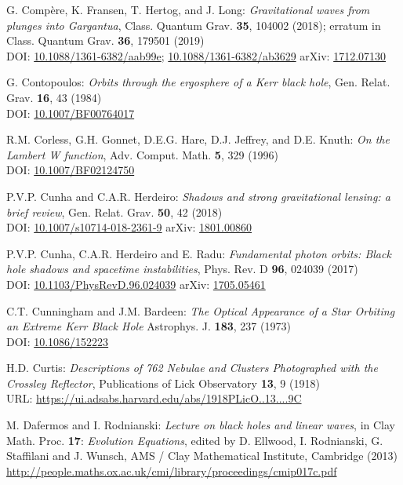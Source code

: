 \begin{thebibliography}{123}
G. Compère, K. Fransen, T. Hertog, and J. Long:
{\em Gravitational waves from plunges into Gargantua},
Class. Quantum Grav. {\bf 35}, 104002 (2018);
erratum in Class. Quantum Grav. {\bf 36}, 179501 (2019) \\
DOI: \href{https://doi.org/10.1088/1361-6382/aab99e}{10.1088/1361-6382/aab99e};
\href{https://doi.org/10.1088/1361-6382/ab3629}{10.1088/1361-6382/ab3629}
\hfill
arXiv: \href{https://arxiv.org/abs/1712.07130}{1712.07130}

G. Contopoulos:
{\em Orbits through the ergosphere of a Kerr black hole},
Gen. Relat. Grav. {\bf 16}, 43 (1984)\\
DOI: \href{https://doi.org/10.1007/BF00764017}{10.1007/BF00764017}

R.M. Corless, G.H. Gonnet, D.E.G. Hare, D.J. Jeffrey, and D.E. Knuth:
{\em On the Lambert W function},
Adv. Comput. Math. {\bf 5}, 329 (1996)\\
DOI: \href{https://doi.org/10.1007/BF02124750}{10.1007/BF02124750}

P.V.P. Cunha and C.A.R. Herdeiro:
{\em Shadows and strong gravitational lensing: a brief review},
Gen. Relat. Grav. {\bf 50}, 42 (2018)\\
DOI: \href{https://doi.org/10.1007/s10714-018-2361-9}{10.1007/s10714-018-2361-9}\hfill
arXiv: \href{https://arxiv.org/abs/1801.00860}{1801.00860}

P.V.P. Cunha, C.A.R. Herdeiro and E. Radu:
{\em Fundamental photon orbits: Black hole shadows and spacetime instabilities},
Phys. Rev. D {\bf 96}, 024039 (2017)\\
DOI: \href{https://doi.org/10.1103/PhysRevD.96.024039}{10.1103/PhysRevD.96.024039}\hfill
arXiv: \href{https://arxiv.org/abs/1705.05461}{1705.05461}

C.T. Cunningham and J.M. Bardeen:
{\em The Optical Appearance of a Star Orbiting an Extreme Kerr Black Hole}
Astrophys. J. {\bf 183}, 237 (1973)\\
DOI: \href{https://doi.org/10.1086/152223}{10.1086/152223}

H.D. Curtis:
{\em Descriptions of 762 Nebulae and Clusters Photographed with the Crossley Reflector},
Publications of Lick Observatory {\bf 13}, 9 (1918)\\
URL: \url{https://ui.adsabs.harvard.edu/abs/1918PLicO..13....9C}

M. Dafermos and I. Rodnianski: {\em Lecture on black holes and linear waves},
in  Clay Math. Proc. {\bf 17}: {\em Evolution Equations}, edited by
D. Ellwood, I. Rodnianski, G. Staffilani and J. Wunsch, AMS / Clay Mathematical Institute,
Cambridge (2013) \\
\url{http://people.maths.ox.ac.uk/cmi/library/proceedings/cmip017c.pdf}


\end{thebibliography}

